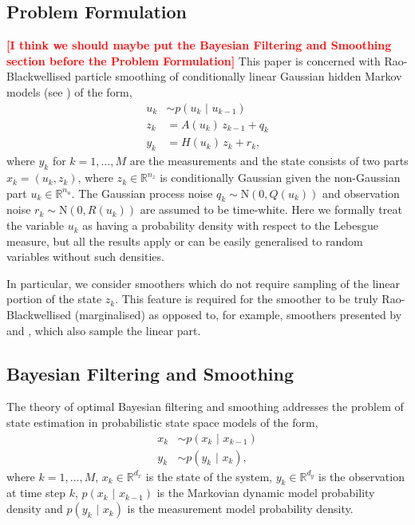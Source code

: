 \documentclass[twocolumn]{autart}    %
\newcommand{\comment}[1]{\textcolor{red}{\textbf{[#1]}}}
\begin{document}
\subsection{Problem Formulation}
%
\comment{I think we should maybe put the Bayesian Filtering and Smoothing section before the Problem Formulation}
%
This paper is concerned with Rao-Blackwellised particle smoothing of conditionally linear Gaussian hidden Markov models
(see \cite{Doucet+Godsill+Andrieu:2000}) of the form,
%
\begin{equation}
\begin{split}
  u_k &\sim p(u_k \, \,|\, \, u_{k-1}) \\
  z_k &= A(u_{k}) \, z_{k-1} + q_{k} \\
  y_k &= H(u_k) \, z_{k} + r_{k},
\end{split}
\label{eq:condgauss}
\end{equation}
%
where $y_k$ for $k=1,\ldots,M$ are the measurements and the state consists of two parts $x_k = (u_k,z_k)$, where $z_k \in \mathbb{R}^{n_z}$ is conditionally Gaussian given the non-Gaussian part $u_k \in \mathbb{R}^{n_u}$. The Gaussian process noise $q_{k} \sim \mathrm{N}(0, Q(u_{k}))$ and observation noise $r_{k} \sim \mathrm{N}(0, R(u_{k}))$ are assumed to be time-white. Here we formally treat the variable $u_k$ as having a probability density with respect to the Lebesgue measure, but all the results apply or can be easily generalised to random variables without such densities.

In particular, we consider smoothers which do not require sampling of the linear portion of the state $z_k$. This feature is required for the smoother to be truly Rao-Blackwellised (marginalised) as opposed to, for example, smoothers presented by \cite{Fong+Godsill+Doucet+West:2002} and \cite{Lindsten+Schon:2011}, which also sample the linear part.

\subsection{Bayesian Filtering and Smoothing}
%
The theory of optimal Bayesian filtering and smoothing \cite{Ho+Lee:1964,Lee:1964} addresses the problem of state estimation in probabilistic state space models of the form,
%
\begin{equation}
\begin{split}
  x_k &\sim p(x_k \, \,|\, \, x_{k-1}) \\
  y_k &\sim p(y_k \, \,|\, \, x_{k}),
\end{split}
\label{eq:genmodel}
\end{equation}
%
where $k=1,\ldots,M$, $x_k \in \mathbb{R}^{d_x}$ is the state of the system, $y_k \in \mathbb{R}^{d_y}$ is the observation at time step $k$, $p(x_k \, \,|\, \, x_{k-1})$ is the Markovian dynamic model probability density and $p(y_k \, \,|\, \, x_{k})$ is the measurement model probability density.
\end{document}

